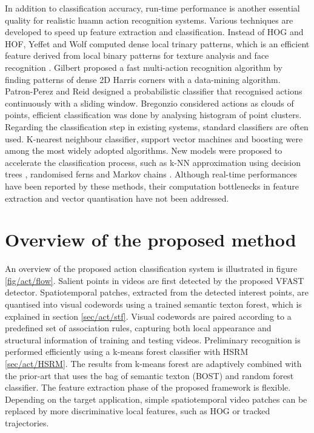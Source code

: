 In addition to classification accuracy, run-time performance is another essential quality for realistic huamn action recognition systems. Various techniques are developed to speed up feature extraction and classification. 
Instead of HOG and HOF, Yeffet and Wolf \cite{Yeffet2009} computed dense local trinary patterns, which is an efficient feature derived from local binary patterns for texture analysis and face recognition \cite{Ahonen2006}. 
Gilbert \etal \cite{Gilbert2009} proposed a fast multi-action recognition algorithm by finding patterns of dense 2D Harris corners with a data-mining algorithm.
Patron-Perez and Reid \cite{Patron2007} designed a probabilistic classifier that recognised actions continuously with a sliding window. 
Bregonzio \etal \cite{Bregonzio2009} considered actions as clouds of points, efficient classification was done by analysing histogram of point clusters. 
Regarding the classification step in existing systems, standard classifiers are often used.
K-nearest neighbour classifier, support vector machines and boosting were among the most widely adopted algorithms. New models were proposed to accelerate the classification process, such as k-NN approximation using decision trees \cite{Lin2009}, randomised ferns \cite{Oshin2009} and Markov chains \cite{Messing2009}.   
Although real-time performances have been reported by these methods, their computation bottlenecks in feature extraction and vector quantisation have not been addressed. 

\section{Overview of the proposed method} 
\label{sec/act/overview}

An overview of the proposed action classification system is illustrated in figure \ref{fig/act/flow}. 
Salient points in videos are first detected by the proposed VFAST detector. 
Spatiotemporal patches, extracted from the detected interest points, are quantised into visual codewords using a trained semantic texton forest, which is explained in section \ref{sec/act/stf}. 
Visual codewords are paired according to a predefined set of association rules, capturing both local appearance and structural information of training and testing videos.  
Preliminary recognition is performed efficiently using a k-means forest classifier with HSRM \ref{sec/act/HSRM}. 
The results from k-means forest are adaptively combined with the prior-art that uses the bag of semantic texton (BOST) and random forest classifier.
The feature extraction phase of the proposed framework is flexible. 
Depending on the target application, simple spatiotemporal video patches can be replaced by more discriminative local features, such as HOG or tracked trajectories.


